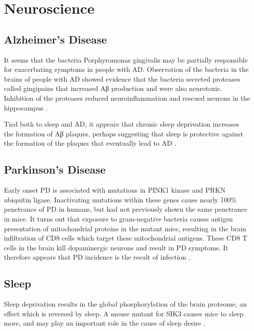 \documentclass[]{book}
\begin{document}
\chapter{Neuroscience}\label{neurosci}

\section{Alzheimer's Disease}\label{alzheimers-disease}

It seems that the bacteria Porphyromonas gingivalis may be partially
responsible for exacerbating symptoms in people with AD. Observation of
the bacteria in the brains of people with AD showed evidence that the
bacteria secreted proteases called gingipains that increased Aβ
production and were also neurotoxic. Inhibition of the proteases reduced
neuroinflammation and rescued neurons in the hippocampus
\citep{dominy2019porphyromonas}.

Tied both to sleep and AD, it appears that chronic sleep deprivation
increases the formation of Aβ plaques, perhaps suggesting that sleep is
protective against the formation of the plaques that eventually lead to
AD \citep{Holth2019-cd}.

\section{Parkinson's Disease}\label{parkinsons-disease}

Early onset PD is associated with mutations in PINK1 kinase and PRKN
ubiquitin ligase. Inactivating mutations within these genes cause nearly
100\% penetrance of PD in humans, but had not previously shown the same
penetrance in mice. It turns out that exposure to gram-negative bacteria
causes antigen presentation of mitochondrial proteins in the mutant
mice, resulting in the brain infiltration of CD8 cells which target
these mitochondrial antigens. These CD8 T cells in the brain kill
dopaminergic neurons and result in PD symptoms. It therefore appears
that PD incidence is the result of infection
\citep{matheoud2019intestinal}.

\section{Sleep}\label{sleep}

Sleep deprivation results in the global phosphorylation of the brain
proteome, an effect which is reversed by sleep. A mouse mutant for SIK3
causes mice to sleep more, and may play an important role in the cause
of sleep desire \citep{wang2018quantitative}.
\end{document}
